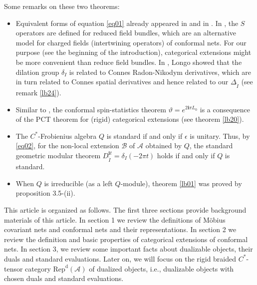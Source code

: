 \documentclass[12pt,a4paper]{article}
\theoremstyle{definition}
\theoremstyle{plain}
\newcommand{\mc}{\mathcal}
\newcommand{\wtd}{\widetilde}
\newcommand{\im}{\mathbf{i}}
\newcommand{\RepdA}{\mathrm{Rep}^{\mathrm d}(\mc A)}
\numberwithin{equation}{section}
\begin{document}
Some remarks on these two theorems:
\begin{itemize}
\item Equivalent forms of equation \eqref{eq01} already appeared in \cite{FRS92,Joer96} and in \cite{Lon97}. In \cite{FRS92,Joer96}, the $S$ operators are defined for reduced field bundles, which are an alternative model for charged fields (intertwining operators) of conformal nets. For our purpose (see the beginning of the introduction), categorical extensions might be more convenient than reduce field bundles. In \cite{Lon97}, Longo showed that the dilation group $\delta_I$ is related to Connes Radon-Nikodym derivatives, which are in turn related to Connes spatial derivatives and hence related to our $\Delta_{\wtd I}$ (see remark \ref{lb24}).
\item Similar to \cite{Joer96,GL96}, the conformal spin-statistics theorem $\vartheta=e^{2\im\pi L_0}$  is a consequence of the PCT theorem for (rigid) categorical extensions (see theorem \ref{lb20}).
\item The $C^*$-Frobienius algebra $Q$ is standard if and only if $\epsilon$ is unitary. Thus, by \eqref{eq02}, for the non-local extension $\mc B$ of $\mc A$ obtained by $Q$, the standard geometric modular theorem $D_{\wtd I}^{\im t}=\delta_I(-2\pi t)$ holds if and only if $Q$ is standard.
\item When $Q$ is irreducible (as a left $Q$-module), theorem \ref{lb01} was proved by \cite{LR04} proposition 3.5-(ii).
\end{itemize}


This article is organized as follows. The first three sections provide background materials of this article. In section 1 we review the definitions of M\"obius covariant nets and conformal nets and their representations. In section 2 we review the definition and basic properties of categorical extensions of conformal nets. In section 3, we review some important facts about dualizable objects, their duals and standard evaluations. Later on, we will focus on the rigid braided $C^*$-tensor category $\RepdA$ of dualized objects, i.e., dualizable objects with chosen duals and standard evaluations.  
\end{document}
